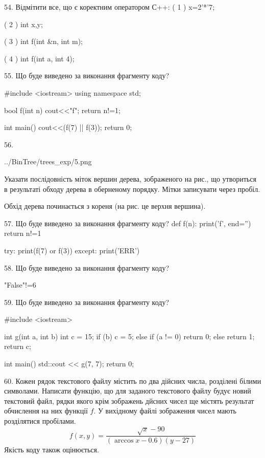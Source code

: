 \documentclass[11pt]{article}
\begin{document}
54. %
Відмітити все, що є коректним оператором С++:
( 1 ) x=2'*'7;

( 2 ) {int x,y;}

( 3 ) int f(int &n, int m);

( 4 ) int f(int a, int 4);
\vspace{5mm}

55. Що буде виведено за виконання фрагменту коду?

#include <iostream>
using namespace std;

bool f(int n){
    cout<<"f";
    return n!=1;
}

int main(){
    cout<<(f(7) || f(3));
    return 0;
}
\vspace{5mm}

56. 

\begin{center}
	{../BinTree/trees_exp/5.png}
\end{center}
Указати послідовність міток вершин дерева, зображеного на рис., що утвориться в результаті обходу дерева в оберненому порядку. Мітки записувати через пробіл.\par Обхід дерева починається з кореня (на рис. це верхня вершина).
\vspace{5mm}

57. Що буде виведено за виконання фрагменту коду?
def f(n):
    print('f', end='')
    return n!=1

try:
    print(f(7) or f(3))
except:
    print('ERR')
\vspace{5mm}

58. Що буде виведено за виконання фрагменту коду?

"False"!=6
\vspace{5mm}

59. Що буде виведено за виконання фрагменту коду?

#include <iostream>

int g(int a, int b){
    int c = 15;
    if (b)
        c = 5;
    else if (a != 0)
         return 0;
    else 
        return 1;
    return c;
}

int main(){
    std::cout << g(7, 7);
    return 0;
}
\vspace{5mm}

60. 
Кожен рядок текстового файлу містить по два дійсних числа, розділені білими символами.
Написати функцію, що для заданого текстового файлу будує новий текстовий файл, рядки якого крім зображень дйсних чисел ще містять результат обчислення на них функції $f$. У вихідному файлі зображення чисел мають розділятися пробілами. 
$$f(x, y) =\frac{\sqrt x - 90}{(\arccos x - 0.6) (y - 27)}$$ 
Якість коду також оцінюється.
\end{document}

